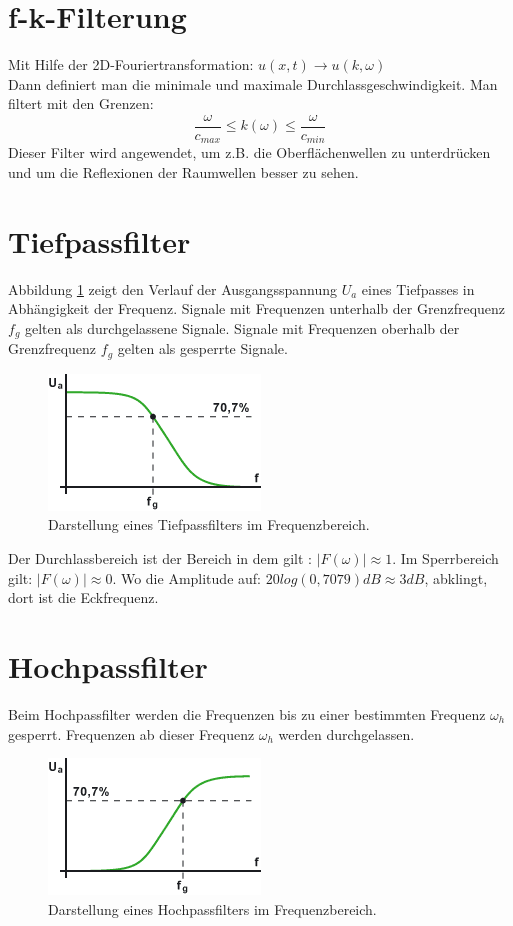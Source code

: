 \section{f-k-Filterung}
Mit Hilfe der 2D-Fouriertransformation: $u(x,t)\longrightarrow u(k,\omega)$\\
Dann definiert man die minimale und maximale Durchlassgeschwindigkeit. Man filtert mit den Grenzen: \\
\begin{equation*}
\dfrac{\omega}{c_{max}}\leq k(\omega)\leq \frac{\omega}{c_{min}}
\end{equation*}
Dieser Filter wird angewendet, um z.B. die Oberflächenwellen zu unterdrücken und um die Reflexionen der Raumwellen besser zu sehen.

\section{Tiefpassfilter}
Abbildung \ref{fig:filt_tiefpass} zeigt den Verlauf der Ausgangsspannung $U_a$ eines Tiefpasses in Abhängigkeit der Frequenz. Signale mit Frequenzen unterhalb der Grenzfrequenz $f_g$ gelten als durchgelassene Signale. Signale mit Frequenzen oberhalb der Grenzfrequenz $f_g$ gelten als gesperrte Signale.\\
\begin{figure}[h!]
\centering
\includegraphics[width=.4\tw]{fig/06-Filter/tiefpass.png}
\caption{Darstellung eines Tiefpassfilters im Frequenzbereich.}
\label{fig:filt_tiefpass}
\end{figure}
Der Durchlassbereich ist der Bereich in dem gilt : $\vert F(\omega) \vert \approx 1 $.
Im Sperrbereich gilt: $\vert F(\omega) \vert \approx 0 $. Wo die Amplitude auf: 
$20log(0,7079)dB \approx 3dB$,  abklingt, dort ist die Eckfrequenz.

\section{Hochpassfilter}
Beim Hochpassfilter werden die Frequenzen bis zu einer bestimmten Frequenz $\omega_{h}$  gesperrt. Frequenzen ab dieser Frequenz $\omega_{h}$ werden durchgelassen.
\begin{figure}[h!]
\centering
\includegraphics[width=.4\tw]{fig/06-Filter/hochpass.png}
\caption{Darstellung eines Hochpassfilters im Frequenzbereich.}
\end{figure}


